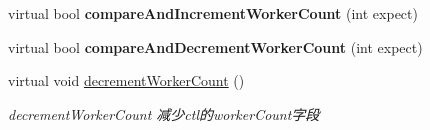 \begin{DoxyCompactItemize}
\mbox{\label{classThreadPoolExecutor_aa07228718089dc67885806cd663c1df1}} 
virtual bool {\bfseries compare\+And\+Increment\+Worker\+Count} (int expect)
\item 
\mbox{\label{classThreadPoolExecutor_a3786ea6be7685ab4e6674014fbff35cd}} 
virtual bool {\bfseries compare\+And\+Decrement\+Worker\+Count} (int expect)
\item 
\mbox{\label{classThreadPoolExecutor_ab19dcfa8af5864274e66bccf40255484}} 
virtual void \hyperlink{classThreadPoolExecutor_ab19dcfa8af5864274e66bccf40255484}{decrement\+Worker\+Count} ()
\begin{DoxyCompactList}\small\item\em decrement\+Worker\+Count 减少ctl的worker\+Count字段 \end{DoxyCompactList}\end{DoxyCompactItemize}
